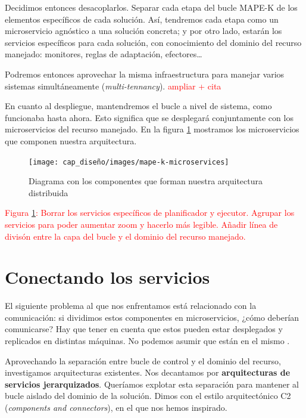 Decidimos entonces desacoplarlos. Separar cada etapa del bucle MAPE-K de los elementos específicos de cada solución. Así, tendremos cada etapa como un microservicio agnóstico a una solución concreta; y por otro lado, estarán los servicios específicos para cada solución, con conocimiento del dominio del recurso manejado: monitores, reglas de adaptación, efectores\dots

Podremos entonces aprovechar la misma infraestructura para manejar varios sistemas simultáneamente (\emph{multi-tennancy}). \textcolor{red}{ampliar + cita}

En cuanto al despliegue, mantendremos el bucle a nivel de sistema, \cite{mendoncaGeneralityVsReusability2018} como funcionaba hasta ahora. Esto significa que se desplegará conjuntamente con los microservicios del recurso manejado. En la figura \ref{fig:mape-k-microservices} mostramos los microservicios que componen nuestra arquitectura.

\begin{figure}[htb]
  \centering
  \texttt{[image: cap\_diseño/images/mape-k-microservices]}
  \caption{Diagrama con los componentes que forman nuestra arquitectura distribuida}
  \label{fig:mape-k-microservices}
\end{figure}

\textcolor{red}{Figura \ref{fig:mape-k-microservices}: Borrar los servicios específicos de planificador y ejecutor. Agrupar los servicios para poder aumentar zoom y hacerlo más legible. Añadir línea de divisón entre la capa del bucle y el dominio del recurso manejado.}

\section{Conectando los servicios}

El siguiente problema al que nos enfrentamos está relacionado con la comunicación: si dividimos estos componentes en microservicios, ¿cómo deberían comunicarse? Hay que tener en cuenta que estos pueden estar desplegados y replicados en distintas máquinas. No podemos asumir que están en el mismo .

Aprovechando la separación entre bucle de control y el dominio del recurso, investigamos arquitecturas existentes. Nos decantamos por \textbf{arquitecturas de servicios jerarquizados}. Queríamos explotar esta separación para mantener al bucle aislado del dominio de la solución. Dimos con el estilo arquitectónico C2 (\emph {components and connectors})\cite{taylorComponentMessagebasedArchitectural1996a, UCISoftwareArchitecture}, en el que nos hemos inspirado.

